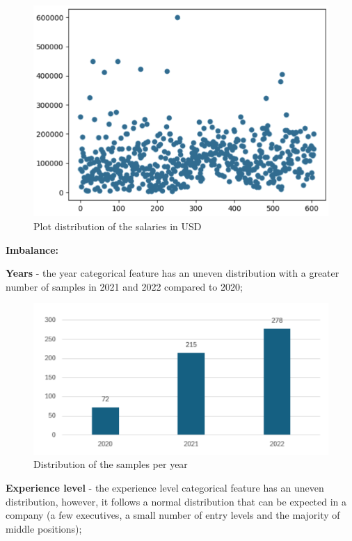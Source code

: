 \documentclass[11pt,a4paper]{article}
\newcommand{\SubItem}[1]{
  {\setlength\itemindent{13pt} \item[◦] #1}
}
\begin{document}
\begin{itemize}
\begin{figure}
    \centering
    \includegraphics[width=1\linewidth]{ICS-5110-Fig-03.png}
    \caption{Plot distribution of the salaries in USD}
    \label{fig:Plot distribution of the salaries in USD}
\end{figure}

\item \textbf{Imbalance:}
\SubItem{\textbf{Years} - the year categorical feature has an uneven distribution with a greater number of samples in 2021 and 2022 compared to 2020;}

\begin{figure}
    \centering
    \includegraphics[width=1\linewidth]{ICS-5110-Fig-04.png}
    \caption{Distribution of the samples per year}
    \label{fig:Distribution of the samples per year}
\end{figure}

\SubItem{\textbf{Experience level} - the experience level categorical feature has an uneven distribution, however, it follows a normal distribution that can be expected in a company (a few executives, a small number of entry levels and the majority of middle positions);}


\end{itemize}
\end{document}
